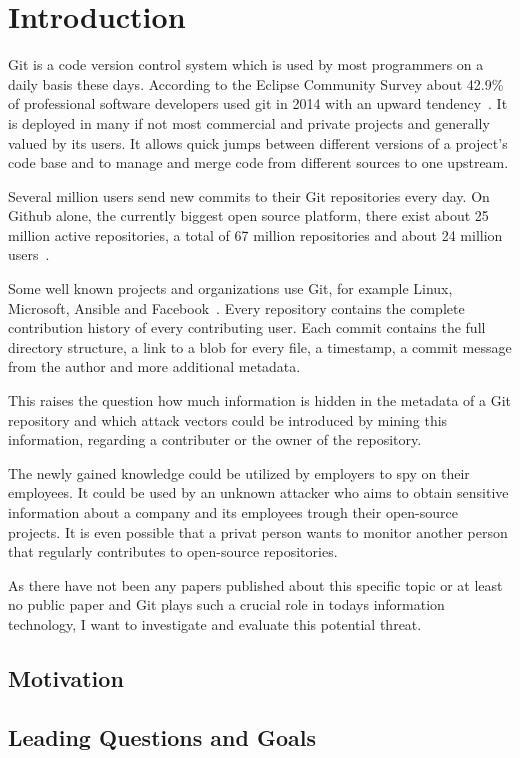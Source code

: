 \chapter{Introduction}

Git is a code version control system which is used by most programmers on a daily basis these days.
According to the Eclipse Community Survey about 42.9\% of professional software developers used git in 2014 with an upward tendency~\cite{article:git-popularity}.
It is deployed in many if not most commercial and private projects and generally valued by its users.
It allows quick jumps between different versions of a project's code base and to manage and merge code from different sources to one upstream.

Several million users send new commits to their Git repositories every day.
On Github alone, the currently biggest open source platform, there exist about 25 million active repositories, a total of 67 million repositories and about 24 million users~\cite{article:github-statistics}.

Some well known projects and organizations use Git, for example Linux, Microsoft, Ansible and Facebook~\cite{ article:github-statistics}.
Every repository contains the complete contribution history of every contributing user.
Each commit contains the full directory structure, a link to a blob for every file, a timestamp, a commit message from the author and more additional metadata.

This raises the question how much information is hidden in the metadata of a Git repository and which attack vectors could be introduced by mining this information, regarding a contributer or the owner of the repository.

The newly gained knowledge could be utilized by employers to spy on their employees.
It could be used by an unknown attacker who aims to obtain sensitive information about a company and its employees trough their open-source projects.
It is even possible that a privat person wants to monitor another person that regularly contributes to open-source repositories.

As there have not been any papers published about this specific topic or at least no public paper and Git plays such a crucial role in todays information technology, I want to investigate and evaluate this potential threat.

\section{Motivation}

\section{Leading Questions and Goals}
